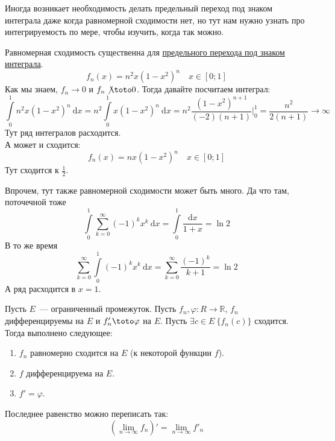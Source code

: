 \documentclass{article}
\begin{document}
    \begin{remark}
        Иногда возникает необходимость делать предельный переход под знаком интеграла даже когда равномерной сходимости нет, но тут нам нужно узнать про интегрируемость по мере, чтобы изучить, когда так можно.
    \end{remark}
    \begin{example}
        Равномерная сходимость существенна для \hyperref[Предельный переход под знаком интеграла]{предельного перехода под знаком интеграла}.
        $$
        f_n(x)=n^2x(1-x^2)^n\quad x\in[0;1]
        $$
        Как мы знаем, $f_n\to0$ и $f_n\not\toto0$. Тогда давайте посчитаем интеграл:
        $$
        \int\limits_0^1n^2x(1-x^2)^n~\mathrm dx=n^2\int\limits_0^1x(1-x^2)^n~\mathrm dx=n^2\frac{(1-x^2)^{n+1}}{(-2)(n+1)}\Bigg|_0^1=\frac{n^2}{2(n+1)}\to\infty
        $$
        Тут ряд интегралов расходится.\\
        А может и сходится:
        $$
        f_n(x)=nx(1-x^2)^n\quad x\in[0;1]
        $$
        Тут сходится к $\frac12$.
    \end{example}
    \begin{example}
        Впрочем, тут также равномерной сходимости может быть много. Да что там, поточечной тоже
        $$
        \int\limits_0^1\sum\limits_{k=0}^\infty(-1)^kx^k~\mathrm dx=\int\limits_0^1\frac{\mathrm dx}{1+x}=\ln2
        $$
        В то же время
        $$
        \sum\limits_{k=0}^\infty\int\limits_0^1(-1)^kx^k~\mathrm dx=\sum\limits_{k=0}^\infty\frac{(-1)^k}{k+1}=\ln2
        $$
        А ряд расходится в $x=1$.
    \end{example}
    \begin{theorem}
        Пусть $E$~--- ограниченный промежуток. Пусть $f_n,\varphi\colon R\to\mathbb R$, $f_n$ дифференцируемы на $E$ и $f'_n\toto\varphi$ на $E$. Пусть $\exists c\in E~\{f_n(c)\}$ сходится.\\
        Тогда выполнено следующее:
        \begin{enumerate}
            \item $f_n$ равномерно сходится на $E$ (к некоторой функции $f$).
            \item $f$ дифференцируема на $E$.
            \item $f'=\varphi$.
        \end{enumerate}
        Последнее равенство можно переписать так:
        $$
        \left(\lim\limits_{n\to\infty}f_n\right)'=\lim\limits_{n\to\infty}f'_n
        $$
    \end{theorem}
\end{document}
